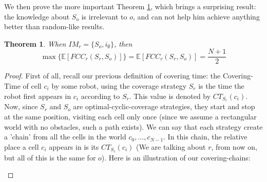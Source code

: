 \documentclass[letterpaper, 10 pt, conference]{ieeeconf}  %
\newtheorem{theorem}{Theorem}[section]
\newcommand\rob{\ensuremath{r}\xspace}
\newcommand\opp{\ensuremath{o}\xspace}
\newcommand{\fcc}{\ensuremath{FCC}\xspace}
\begin{document}
We then prove the more important Theorem \ref{theorems: 2d max fcc unknown io}, which brings a surprising result: the knowledge about $S_\opp$ is irrelevant to \opp, and can not help him achieve anything better than random-like results.

\begin{theorem}\label{theorems: 2d max fcc unknown io}
When $IM_\rob=\lbrace S_\opp , i_\emptyset \rbrace$, then 
\begin{dmath*}[compact]
\max \lbrace \mathbb{E}[\fcc_\rob(S_\rob, S_\opp)]\rbrace=\mathbb{E}[\fcc_\rob(S_\rob, S_\opp)]=\frac{N+1}{2}
\end{dmath*}
\end{theorem}

\begin{proof}
First of all, recall our previous definition of covering time: the Covering-Time of cell $c_i$ by some robot, using the coverage strategy $S_{\rob}$ is the time the robot first appears in $c_i$ according to $S_{\rob}$. This value is denoted by ${CT}_{S_{\rob}}(c_i)$. 
Now, since $S_{\rob}$ and $S_{\opp}$ are optimal-cyclic-coverage strategies, they start and stop at the same position, visiting each cell only once (since we assume a rectangular world with no obstacles, such a path exists). We can say that each strategy create a 'chain' from all the cells in the world $c_0,...,c_{N-1}$. In this chain, the relative place a cell $c_i$ appears in is its ${CT}_{S_{\rob}}(c_i)$ (We are talking about \rob,  from now on, but all of this is the same for \opp). Here is an illustration of our covering-chains:
\begin{figure}[tb]
\centering
{}
\newline
{}
\end{figure}
\end{proof}
\end{document}
